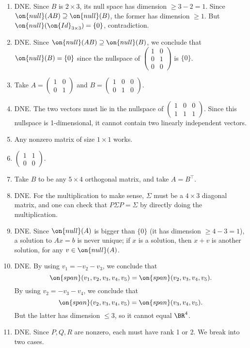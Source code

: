 \documentclass[10pt]{amsart}
\theoremstyle{mythm}
\theoremstyle{definition}
\theoremstyle{myrmk}
\begin{document}
\begin{enumerate}
		\item DNE. Since $B$ is $2 \times 3$, its null space has dimension $\ge 3-2 = 1$. Since $\on{null}(AB) \supseteq \on{null}(B)$, the former has dimension $ \ge 1$. But $\on{null}(\on{Id}_{3 \times 3}) = \{0\}$, contradiction. 
		\item DNE. Since $\on{null}(AB)\supseteq \on{null}(B)$, we conclude that $\on{null}(B) = \{0\}$ since the nullspace of $\begin{pmatrix}
		1 & 0 \\ 0 & 1 \\ 0 & 0 
		\end{pmatrix}$ is $\{0\}$. 
		\item Take $A = \begin{pmatrix}
		1 & 0 \\ 0 & 1 
		\end{pmatrix}$ and $B = \begin{pmatrix}
		1 & 0 & 0 \\ 0 & 1 & 0 
		\end{pmatrix}$.  
		\item DNE. The two vectors must lie in the nullspace of $\begin{pmatrix}
		1 & 0 & 0 \\ 1 & 1 & 1 
		\end{pmatrix}$. 
		Since this nullspace is 1-dimensional, it cannot contain two linearly independent vectors. 
		\item Any nonzero matrix of size $1 \times 1$ works. 
		\item $\begin{pmatrix}
		1 & 1 \\ 0 & 0
		\end{pmatrix}$.  
		\item Take $B$ to be any $5 \times 4$ orthogonal matrix, and take $A = B^\top$. 
		\item DNE. For the multiplication to make sense, $\Sigma$ must be a $4 \times 3$ diagonal matrix, and one can check that $P \Sigma P = \Sigma$ by directly doing the multiplication. 
		\item DNE. Since $\on{null}(A)$ is bigger than $\{0\}$ (it has dimension $ \ge 4 - 3= 1$), a solution to $Ax = b$ is never unique; if $x$ is a solution, then $x + v$ is another solution, for any $v \in \on{null}(A)$. 
		\item DNE. By using $v_1 = -v_2 - v_3$, we conclude that 
		\[
			\on{span}(v_1, v_2, v_3, v_4, v_5) = \on{span}(v_2, v_3, v_4, v_5). 
		\]
		By using $v_2 = -v_3 - v_4$, we conclude that 
		\[
			\on{span}(v_2, v_3, v_4, v_5) = \on{span}(v_3, v_4, v_5). 
		\]
		But the latter has dimension $\le 3$, so it cannot equal $\BR^4$. 
		\item DNE.	Since $P, Q, R$ are nonzero, each must have rank 1 or 2. We break into two cases. 
		

\end{enumerate}
\end{document}

